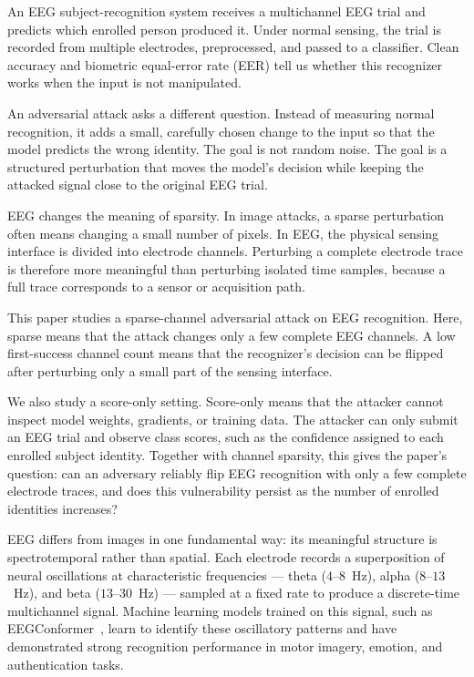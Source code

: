 \documentclass[journal]{IEEEtran}
\begin{document}
An EEG subject-recognition system receives a multichannel EEG trial and predicts which enrolled person produced it. Under normal sensing, the trial is recorded from multiple electrodes, preprocessed, and passed to a classifier. Clean accuracy and biometric equal-error rate (EER) tell us whether this recognizer works when the input is not manipulated.

An adversarial attack asks a different question. Instead of measuring normal recognition, it adds a small, carefully chosen change to the input so that the model predicts the wrong identity. The goal is not random noise. The goal is a structured perturbation that moves the model's decision while keeping the attacked signal close to the original EEG trial.

EEG changes the meaning of sparsity. In image attacks, a sparse perturbation often means changing a small number of pixels. In EEG, the physical sensing interface is divided into electrode channels. Perturbing a complete electrode trace is therefore more meaningful than perturbing isolated time samples, because a full trace corresponds to a sensor or acquisition path.

This paper studies a sparse-channel adversarial attack on EEG recognition. Here, sparse means that the attack changes only a few complete EEG channels. A low first-success channel count means that the recognizer's decision can be flipped after perturbing only a small part of the sensing interface.

We also study a score-only setting. Score-only means that the attacker cannot inspect model weights, gradients, or training data. The attacker can only submit an EEG trial and observe class scores, such as the confidence assigned to each enrolled subject identity. Together with channel sparsity, this gives the paper's question: can an adversary reliably flip EEG recognition with only a few complete electrode traces, and does this vulnerability persist as the number of enrolled identities increases?

EEG differs from images in one fundamental way: its meaningful structure is spectrotemporal rather than spatial. Each electrode records a superposition of neural oscillations at characteristic frequencies --- theta ($4$--$8$~Hz), alpha ($8$--$13$~Hz), and beta ($13$--$30$~Hz) --- sampled at a fixed rate to produce a discrete-time multichannel signal. Machine learning models trained on this signal, such as EEGConformer~\cite{song2022eegconformer}, learn to identify these oscillatory patterns and have demonstrated strong recognition performance in motor imagery, emotion, and authentication tasks.
\end{document}
